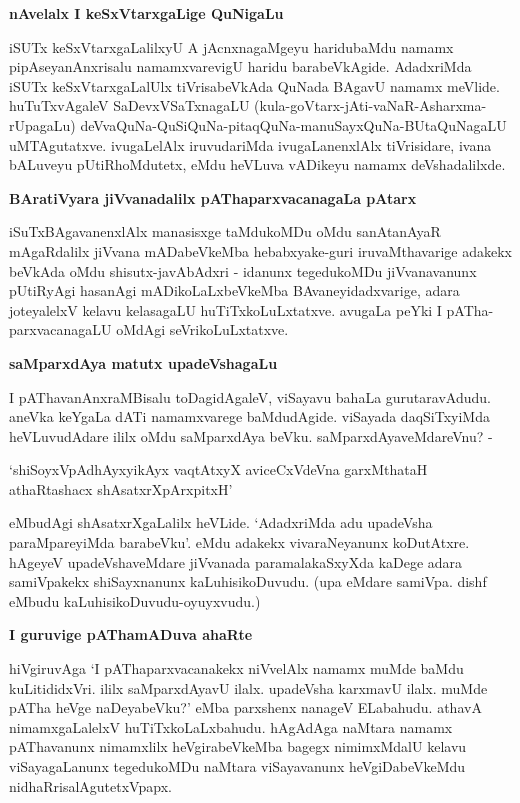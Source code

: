 \noindent
\textbf{nAvelalx I keSxVtarxgaLige QuNigaLu}\label{page104}

iSUTx keSxVtarxgaLalilxyU A jAcnxnagaMgeyu haridubaMdu namamx pipAseyanAnxrisalu namamxvarevigU haridu barabeVkAgide. AdadxriMda iSUTx keSxVtarxgaLalUlx tiVrisabeVkAda QuNada BAgavU namamx meVlide. huTuTxvAgaleV SaDevxVSaTxnagaLU (kula-goVtarx-jAti-vaNaR-Asharxma-rUpagaLu) deVvaQuNa-QuSiQuNa-pitaqQuNa-manuSayxQuNa-BUtaQuNagaLU uMTAgutatxve. ivugaLelAlx iruvudariMda ivugaLanenxlAlx tiVrisidare, ivana bALuveyu pUtiRhoMdutetx, eMdu heVLuva vADikeyu namamx deVshadalilxde.

\noindent
\textbf{BAratiVyara jiVvanadalilx pAThaparxvacanagaLa pAtarx}\label{page105}

iSuTxBAgavanenxlAlx manasisxge taMdukoMDu oMdu sanAtanAyaR mAgaRdalilx jiVvana mADabeVkeMba hebabxyake-guri iruvaMthavarige adakekx beVkAda oMdu shisutx-javAbAdxri - idanunx tegedukoMDu jiVvanavanunx pUtiRyAgi hasanAgi mADikoLaLxbeVkeMba BAvaneyidadxvarige, adara joteyalelxV kelavu kelasagaLU huTiTxkoLuLxtatxve. avugaLa peYki I pATha-parxvacanagaLU oMdAgi seVrikoLuLxtatxve.

\noindent
\textbf{saMparxdAya matutx upadeVshagaLu}\label{page105}

I pAThavanAnxraMBisalu toDagidAgaleV, viSayavu bahaLa gurutaravAdudu. aneVka keYgaLa dATi namamxvarege baMdudAgide. viSayada daqSiTxyiMda heVLuvudAdare ililx oMdu saMparxdAya beVku. saMparxdAyaveMdareVnu? -

\begin{shloka}
`shiSoyxVpAdhAyxyikAyx vaqtAtxyX aviceCxVdeVna garxMthataH athaRtashacx shAsatxrXpArxpitxH'\label{105}
\end{shloka}

eMbudAgi shAsatxrXgaLalilx heVLide. `AdadxriMda adu upadeVsha paraMpareyiMda barabeVku'. eMdu adakekx vivaraNeyanunx koDutAtxre. hAgeyeV upadeVshaveMdare jiVvanada paramalakaSxyXda kaDege adara samiVpakekx shiSayxnanunx kaLuhisikoDuvudu. (upa eMdare samiVpa. dishf eMbudu kaLuhisikoDuvudu-oyuyxvudu.)

\noindent
\textbf{I guruvige pAThamADuva ahaRte}\label{page105}

hiVgiruvAga `I pAThaparxvacanakekx niVvelAlx namamx muMde baMdu kuLitididxVri. ililx saMparxdAyavU ilalx. upadeVsha karxmavU ilalx. muMde pATha heVge naDeyabeVku?' eMba parxshenx nanageV ELabahudu. athavA nimamxgaLalelxV huTiTxkoLaLxbahudu. hAgAdAga naMtara namamx pAThavanunx nimamxlilx heVgirabeVkeMba bagegx nimimxMdalU kelavu viSayagaLanunx tegedukoMDu naMtara viSayavanunx heVgiDabeVkeMdu nidhaRrisalAgutetxVpapx.


